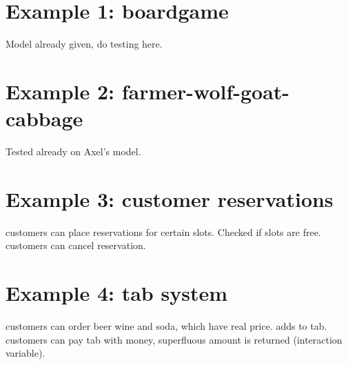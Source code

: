 \section{Example 1: boardgame}
Model already given, do testing here.

\section{Example 2: farmer-wolf-goat-cabbage}
Tested already on Axel's model.

\section{Example 3: customer reservations}
customers can place reservations for certain slots. Checked if slots are free. customers can cancel reservation.

\section{Example 4: tab system}
customers can order beer wine and soda, which have real price. adds to tab. customers can pay tab with money, superfluous amount is returned (interaction variable).
